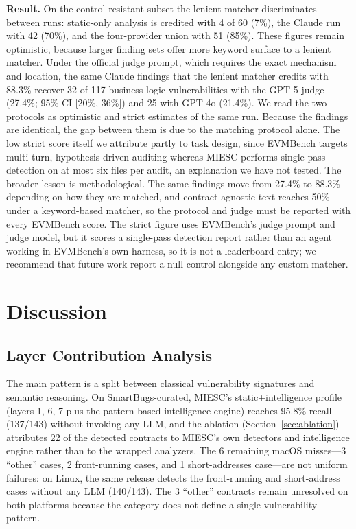 \documentclass[conference]{IEEEtran}
\begin{document}
\textbf{Result.} On the control-resistant subset the lenient matcher discriminates between runs: static-only analysis is credited with 4 of 60 (7\%), the Claude run with 42 (70\%), and the four-provider union with 51 (85\%). These figures remain optimistic, because larger finding sets offer more keyword surface to a lenient matcher. Under the official judge prompt, which requires the exact mechanism and location, the same Claude findings that the lenient matcher credits with 88.3\% recover 32 of 117 business-logic vulnerabilities with the GPT-5 judge (27.4\%; 95\% CI [20\%, 36\%]) and 25 with GPT-4o (21.4\%). We read the two protocols as optimistic and strict estimates of the same run. Because the findings are identical, the gap between them is due to the matching protocol alone. The low strict score itself we attribute partly to task design, since EVMBench targets multi-turn, hypothesis-driven auditing whereas MIESC performs single-pass detection on at most six files per audit, an explanation we have not tested. The broader lesson is methodological. The same findings move from 27.4\% to 88.3\% depending on how they are matched, and contract-agnostic text reaches 50\% under a keyword-based matcher, so the protocol and judge must be reported with every EVMBench score. The strict figure uses EVMBench's judge prompt and judge model, but it scores a single-pass detection report rather than an agent working in EVMBench's own harness, so it is not a leaderboard entry; we recommend that future work report a null control alongside any custom matcher.

\section{Discussion}

\subsection{Layer Contribution Analysis}

The main pattern is a split between classical vulnerability signatures and semantic reasoning. On SmartBugs-curated, MIESC's static+intelligence profile (layers 1, 6, 7 plus the pattern-based intelligence engine) reaches 95.8\% recall (137/143) without invoking any LLM, and the ablation (Section~\ref{sec:ablation}) attributes 22 of the detected contracts to MIESC's own detectors and intelligence engine rather than to the wrapped analyzers. The 6 remaining macOS misses---3 ``other'' cases, 2 front-running cases, and 1 short-addresses case---are not uniform failures: on Linux, the same release detects the front-running and short-address cases without any LLM (140/143). The 3 ``other'' contracts remain unresolved on both platforms because the category does not define a single vulnerability pattern.
\end{document}
